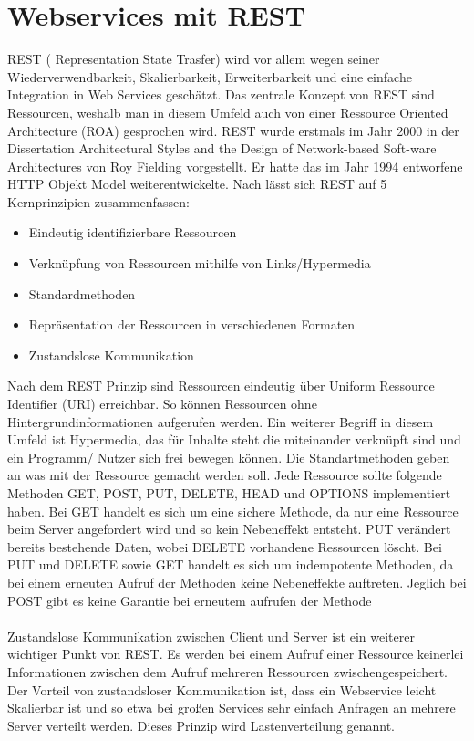 \section{Webservices mit REST}
\label{GrundlagenREST}
\ac{REST} ( Representation State Trasfer) wird vor allem wegen seiner Wiederverwendbarkeit, Skalierbarkeit, Erweiterbarkeit und eine einfache Integration in Web Services geschätzt. Das zentrale Konzept von REST sind Ressourcen, weshalb man in diesem Umfeld auch von einer Ressource Oriented Architecture (\ac{ROA}) gesprochen wird.
\ac{REST} wurde erstmals im Jahr 2000 in der Dissertation Architectural Styles and the Design of Network-based Soft-ware Architectures von Roy Fielding vorgestellt. Er hatte das im Jahr 1994 entworfene \ac{HTTP} Objekt Model weiterentwickelte.
Nach \cite{tilkov2011rest} lässt sich \ac{REST} auf 5 Kernprinzipien zusammenfassen:

\begin{itemize}
	\item Eindeutig identifizierbare Ressourcen
	\item Verknüpfung von Ressourcen mithilfe von Links/Hypermedia
	\item Standardmethoden
	\item Repräsentation der Ressourcen in verschiedenen Formaten
	\item Zustandslose Kommunikation
\end{itemize}

Nach dem \ac{REST} Prinzip sind Ressourcen eindeutig über Uniform Ressource Identifier (\ac{URI}) erreichbar. So können Ressourcen ohne Hintergrundinformationen aufgerufen werden. Ein weiterer Begriff in diesem Umfeld ist Hypermedia, das für Inhalte steht die miteinander verknüpft sind und  ein Programm/ Nutzer sich frei bewegen können.
Die Standartmethoden geben an was mit der Ressource gemacht werden soll. Jede Ressource sollte folgende Methoden GET, POST, PUT,  DELETE, HEAD und OPTIONS implementiert haben. Bei GET handelt es sich um eine sichere Methode, da nur eine Ressource beim Server angefordert wird und so kein Nebeneffekt entsteht. PUT verändert bereits bestehende Daten, wobei DELETE vorhandene Ressourcen löscht. Bei PUT und DELETE sowie GET handelt es sich um indempotente Methoden, da bei einem erneuten Aufruf der Methoden keine Nebeneffekte auftreten. Jeglich bei POST gibt es keine Garantie bei erneutem aufrufen der Methode
\paragraph{}
Zustandslose Kommunikation zwischen Client und Server ist ein weiterer wichtiger Punkt von \ac{REST}. Es werden bei einem Aufruf einer Ressource keinerlei Informationen zwischen dem Aufruf mehreren Ressourcen zwischengespeichert. Der Vorteil von zustandsloser Kommunikation ist, dass ein Webservice leicht Skalierbar ist und so etwa bei großen Services sehr einfach Anfragen an mehrere Server verteilt werden. Dieses Prinzip wird Lastenverteilung genannt.
